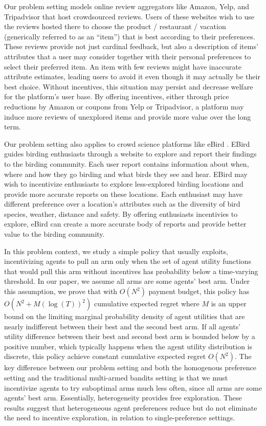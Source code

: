 \documentclass[twoside,11pt]{article}
\begin{document}
Our problem setting models online review aggregators like Amazon, Yelp, and Tripadvisor that host crowdsourced reviews.  Users of these websites wish to use the reviews hosted there to choose the product / restaurant / vacation (generically referred to as an ``item'') that is best according to their preferences.  These reviews provide not just cardinal feedback, but also a description of items' attributes that a user may consider together with their personal preferences to select their preferred item.  An item with few reviews might have inaccurate attribute estimates, leading users to avoid it even though it may actually be their best choice.  Without incentives, this situation may persist and decrease welfare for the platform's user base.  By offering incentives, either through price reductions by Amazon or coupons from Yelp or Tripadvisor, a platform may induce more reviews of unexplored items and provide more value over the long term.

Our problem setting also applies to crowd science platforms like eBird \cite{frazier2014incentivizing, sullivan2009ebird}. EBird guides birding enthusiasts through a website to explore and report their findings to the birding community. Each user report contains information about when, where and how they go birding and what birds they see and hear. EBird may wish to incentivize enthusiasts to explore less-explored birding locations and provide more accurate reports on these locations. Each enthusiast may have different preference over a location's attributes such as the diversity of bird species, weather, distance and safety. By offering enthusiasts incentivies to explore, eBird can create a more accurate body of reports and provide better value to the birding community.


In this problem context, we study a simple policy that usually exploits, incentivizing agents to pull an arm only when the set of agent utility functions that would pull this arm without incentives has probability below a time-varying threshold. In our paper, we assume all arms are some agents' best arm. Under this assumption, we prove that with $O(N^2)$ payment budget, this policy has $O(N^2+M(\log(T))^2)$ cumulative expected regret where $M$ is an upper bound on the limiting marginal probability density of agent utilities that are nearly indifferent between their best and the second best arm. If all agents' utility difference between their best and second best arm is bounded below by a positive number, which typically happens when the agent utility distribution is discrete, this policy achieve constant cumulative expected regret $O(N^2)$. The key difference between our problem setting and both the homogenous preference setting and the traditional multi-armed bandits setting is that we must incentivize agents to try suboptimal arms much less often, since all arms are some agents' best arm.  Essentially, heterogeneity provides free exploration.  These results suggest that heterogeneous agent preferences reduce but do not eliminate the need to incentive exploration, in relation to single-preference settings. 
\end{document}
